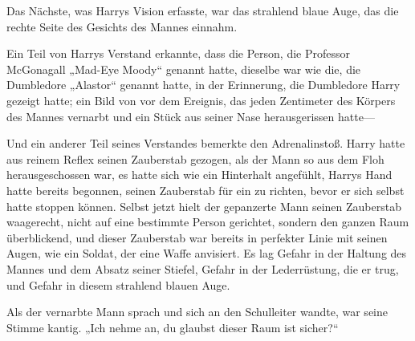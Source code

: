 Das Nächste, was Harrys Vision erfasste, war das strahlend blaue Auge, das die rechte Seite des Gesichts des Mannes einnahm.

Ein Teil von Harrys Verstand erkannte, dass die Person, die Professor McGonagall „Mad-Eye Moody“ genannt hatte, dieselbe war wie die, die Dumbledore „Alastor“ genannt hatte, in der Erinnerung, die Dumbledore Harry gezeigt hatte; ein Bild von vor dem Ereignis, das jeden Zentimeter des Körpers des Mannes vernarbt und ein Stück aus seiner Nase herausgerissen hatte—

Und ein anderer Teil seines Verstandes bemerkte den Adrenalinstoß. Harry hatte aus reinem Reflex seinen Zauberstab gezogen, als der Mann so aus dem Floh herausgeschossen war, es hatte sich wie ein Hinterhalt angefühlt, Harrys Hand hatte bereits begonnen, seinen Zauberstab für ein  zu richten, bevor er sich selbst hatte stoppen können.
Selbst jetzt hielt der gepanzerte Mann seinen Zauberstab waagerecht, nicht auf eine bestimmte Person gerichtet, sondern den ganzen Raum überblickend, und dieser Zauberstab war bereits in perfekter Linie mit seinen Augen, wie ein Soldat, der eine Waffe anvisiert. Es lag Gefahr in der Haltung des Mannes und dem Absatz seiner Stiefel, Gefahr in der Lederrüstung, die er trug, und Gefahr in diesem strahlend blauen Auge.

Als der vernarbte Mann sprach und sich an den Schulleiter wandte, war seine Stimme kantig. „Ich nehme an, du glaubst dieser Raum ist sicher?“

